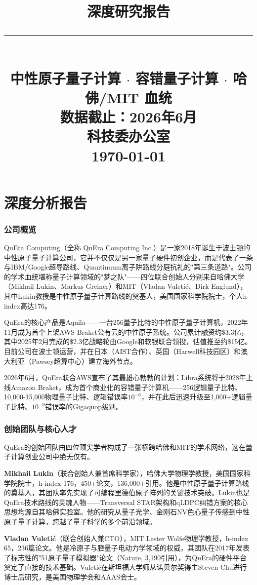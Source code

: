 \documentclass[11pt,a4paper]{ctexart}
\title{\vspace{2cm}{\Huge\bfseries\color{mainred} QuEra Computing\\[6pt] \mbox{}}\\[12pt]{\large 深度研究报告}\\[24pt]\rule{0.5\textwidth}{1.5pt}\\[16pt]{\large 中性原子量子计算 $\cdot$ 容错量子计算 $\cdot$ 哈佛/MIT 血统}\\[8pt]{\footnotesize\color{graytext}数据截止：2026年6月}\\[8pt]{\large 科技委办公室}\\[16pt]{\large\color{graytext}\today}}
\date{}
\begin{document}
\maketitle\thispagestyle{empty}
\newpage\tableofcontents\newpage
\part{深度分析报告}

\section{公司概览}
QuEra Computing（全称 QuEra Computing Inc.）是一家2018年诞生于波士顿的中性原子量子计算公司，它并不仅仅是另一家量子硬件初创企业，而是代表了一条与IBM/Google超导路线、Quantinuum离子阱路线分庭抗礼的"第三条道路"。公司的学术血统堪称量子计算领域的"梦之队"——四位联合创始人分别来自哈佛大学（Mikhail Lukin、Markus Greiner）和MIT（Vladan Vuletić、Dirk Englund），其中Lukin教授是中性原子量子计算路线的奠基人，美国国家科学院院士，个人h-index高达176。

QuEra的核心产品是Aquila——一台256量子比特的中性原子量子计算机，2022年11月成为首个上架AWS Braket公有云的中性原子系统。公司累计融资约\$3.3亿，其中2025年2月完成的\$2.3亿战略轮由Google和软银联合领投，估值推至约\$15亿。目前公司在波士顿运营，并在日本（AIST合作）、英国（Harwell科技园区）和澳大利亚（Pawsey超算中心）建立海外节点。

2026年6月，QuEra联合AWS宣布了其最雄心勃勃的计划：Libra系统将于2028年上线Amazon Braket，成为首个商业化的容错量子计算机——256逻辑量子比特、10,000-15,000物理量子比特、逻辑错误率$10^{-6}$，并在此后迅速升级至1,000+逻辑量子比特、$10^{-9}$错误率的Gigaquop级别。

\section{创始团队与核心人才}

QuEra的创始团队由四位顶尖学者构成了一张横跨哈佛和MIT的学术网络，这在量子计算创业公司中绝无仅有。

\textbf{Mikhail Lukin}（联合创始人兼首席科学家），哈佛大学物理学教授，美国国家科学院院士，h-index 176，450+论文，136,000+引用。他是中性原子量子计算路线的奠基人，其团队率先实现了可编程里德伯原子阵列的关键技术突破。Lukin也是QuEra技术路线的灵魂人物——Transversal STAR架构和qLDPC纠错方案的核心思想均源自其哈佛实验室。他的研究从量子光学、金刚石NV色心量子传感到中性原子量子计算，跨越了量子科学的多个前沿领域。

\textbf{Vladan Vuletić}（联合创始人兼CTO），MIT Lester Wolfe物理学教授，h-index 65，236篇论文。他是冷原子与腔量子电动力学领域的权威，其团队在2017年发表了标志性的"51原子量子模拟器"论文（Nature, 3,190引用），为QuEra的硬件平台奠定了直接的技术基础。Vuletić在斯坦福大学师从诺贝尔奖得主Steven Chu进行博士后研究，是美国物理学会和AAAS会士。
\end{document}
